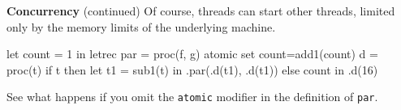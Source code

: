 \begin{minipage}[t]{\sw}
\slidenumber
\LARGE
{\bf Concurrency} (continued)\exx
Of course, threads can start other threads,
limited only by the memory limits of the underlying machine.
\Large
\begin{qv}
let
  count = 1
in
  letrec
    par = proc(f, g) atomic set count=add1(count)
    d = proc(t)
      if t
      then
        let
          t1 = sub1(t)
        in
          .par(.d(t1), .d(t1)) %
      else count
  in
    .d(16) %
\end{qv}
\LARGE
See what happens if you omit the \verb'atomic' modifier
in the definition of \verb'par'.
\end{minipage}
